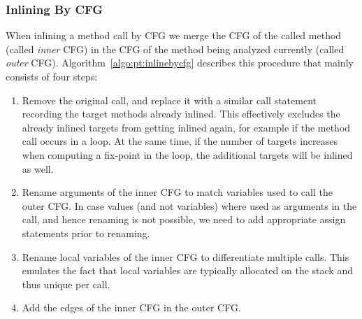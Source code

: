 \documentclass[a4paper]{article}
\begin{document}
\FloatBarrier

\subsubsection{Inlining By CFG}
When inlining a method call by CFG we merge the CFG of the called method
(called \emph{inner} CFG) in the CFG of the method being analyzed currently (called
\emph{outer} CFG). Algorithm~\ref{algo:pt:inlinebycfg} describes this procedure that
mainly consists of four steps:

\begin{enumerate}
    \item Remove the original call, and replace it with a similar call
    statement recording the target methods already inlined. This effectively
    excludes the already inlined targets from getting inlined again, for
    example if the method call occurs in a loop. At the same time, if the
    number of targets increases when computing a fix-point in the loop, the
    additional targets will be inlined as well.

    \item Rename arguments of the inner CFG to match variables used to call the
    outer CFG. In case values (and not variables) where used as arguments in
    the call, and hence renaming is not possible, we need to add appropriate
    assign statements prior to renaming.

    \item Rename local variables of the inner CFG to differentiate multiple
    calls. This emulates the fact that local variables are typically allocated
    on the stack and thus unique per call.

    \item Add the edges of the inner CFG in the outer CFG.
\end{enumerate}
\end{document}
